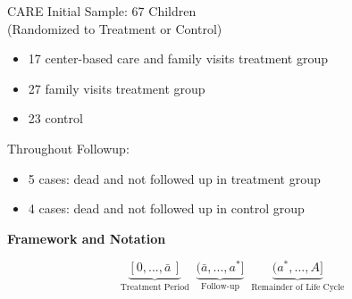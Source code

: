 \documentclass[static]{JJH-Beamer}
\begin{document}
\begin{frame}

\begin{center}
CARE Initial Sample: 67 Children \\(Randomized to Treatment or Control)
\end{center}

\begin{itemize}
\item 17 center-based care and family visits treatment group
\item 27 family visits treatment group
\item 23 control
\end{itemize}

\begin{center}
Throughout Followup:
\end{center}

\begin{itemize}
\item 5 cases: dead and not followed up in treatment group
\item 4 cases: dead and not followed up in control group
\end{itemize}

\end{frame}

\begin{frame}

\begin{center}
\textbf{Framework and Notation}
\end{center}

\end{frame}

\begin{frame}

\begin{equation*}
\underbrace{[0,...,\bar{a}\,]}_{\text{Treatment Period}} \;\; \underbrace{(\bar{a},...,a^{\ast}]}_{\text{Follow-up}} \;\; \underbrace{(a^{\ast},...,A]}_{\text{Remainder of Life Cycle}}
\end{equation*}

\end{frame}

\end{document}
